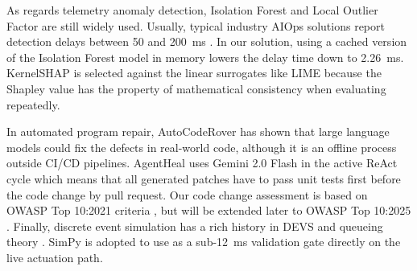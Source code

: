\documentclass[10pt,conference]{IEEEtran}
\begin{document}
As regards telemetry anomaly detection, Isolation Forest \cite{isolationforest} and Local Outlier Factor \cite{lof} are still widely used. Usually, typical industry AIOps solutions report detection delays between 50 and 200~ms \cite{aiops}. In our solution, using a cached version of the Isolation Forest model in memory lowers the delay time down to 2.26~ms. KernelSHAP \cite{kernelshap} is selected against the linear surrogates like LIME \cite{lime} because the Shapley value has the property of mathematical consistency when evaluating repeatedly.

In automated program repair, AutoCodeRover \cite{autocoderover} has shown that large language models could fix the defects in real-world code, although it is an offline process outside CI/CD pipelines. AgentHeal uses Gemini 2.0 Flash \cite{gemini2} in the active ReAct cycle \cite{react} which means that all generated patches have to pass unit tests first before the code change by pull request. Our code change assessment is based on OWASP Top 10:2021 criteria \cite{owasp2021}, but will be extended later to OWASP Top 10:2025 \cite{owasp2025}. Finally, discrete event simulation has a rich history in DEVS \cite{dtsim} and queueing theory \cite{queueing}. SimPy is adopted to use as a sub-12~ms validation gate directly on the live actuation path.
\end{document}
